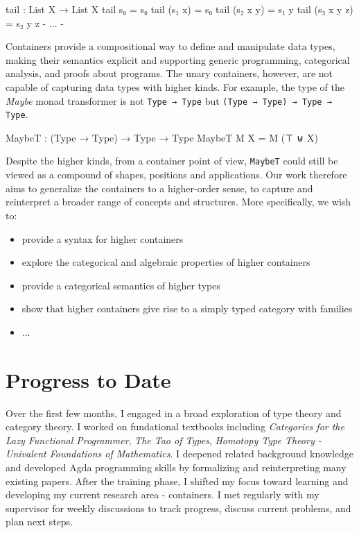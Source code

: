 \begin{code}
tail : List X → List X
tail s₀ = s₀
tail (s₁ x) = s₀
tail (s₂ x y) = s₁ y
tail (s₃ x y z) = s₂ y z
{- ... -}
\end{code}

Containers provide a compositional way to define and manipulate data types, making their semantics explicit and supporting generic programming, categorical analysis, and proofs about programs. The unary containers, however, are not capable of capturing data types with higher kinds. For example, the type of the \textit{Maybe} monad transformer is not \texttt{Type → Type} but \texttt{(Type → Type) → Type → Type}.

\begin{code}
MaybeT : (Type → Type) → Type → Type
MaybeT M X = M (⊤ ⊎ X)
\end{code}

Despite the higher kinds, from a container point of view, \texttt{MaybeT} could still be viewed as a compound of shapes, positions and applications. Our work therefore aims to generalize the containers to a higher-order sense, to capture and reinterpret a broader range of concepts and structures. More specifically, we wish to:

\begin{itemize}
  \item{provide a syntax for higher containers}
  \item{explore the categorical and algebraic properties of higher containers}
  \item{provide a categorical semantics of higher types}
  \item{show that higher containers give rise to a simply typed category with families}
  \item{...}
\end{itemize}

\section{Progress to Date}

Over the first few months, I engaged in a broad exploration of type theory and category theory. I worked on fundational textbooks including \textit{Categories for the Lazy Functional Programmer}, \textit{The Tao of Types}, \textit{Homotopy Type Theory - Univalent Foundations of Mathematics}. I deepened related background knowledge and developed Agda programming skills by formalizing and reinterpreting many existing papers. After the training phase, I shifted my focus toward learning and developing my current research area - containers. I met regularly with my supervisor for weekly discussions to track progress, discuss current problems, and plan next steps.

